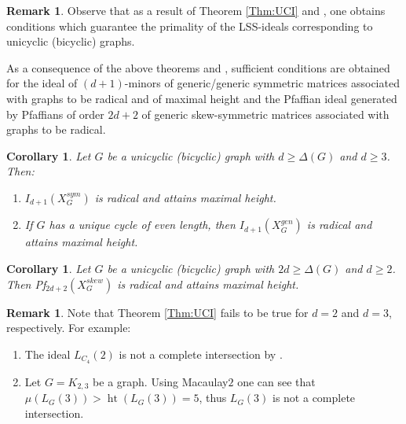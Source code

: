 \documentclass[11pt,a4paper,reqno]{amsart}
\newtheorem{cor}[thm]{Corollary}
\theoremstyle{definition}
\newtheorem{remark}[thm]{Remark}
\numberwithin{equation}{section}
\DeclareMathOperator{\het}{ht}
\begin{document}
\begin{remark}
    Observe that as a result of Theorem \ref{Thm:UCI} and \cite[Theorem $1.1$]{CW2019}, one obtains conditions which guarantee the primality of the LSS-ideals corresponding to unicyclic (bicyclic) graphs.   
\end{remark}


As a consequence of the above theorems and \cite[Proposition 7.4, 7.5, 7.7]{CW2019}, sufficient conditions are obtained for the ideal of $(d+1)$-minors of generic/generic symmetric matrices associated with 
graphs to be radical and of maximal height and the Pfaffian ideal generated by Pfaffians of order $2d+2$ of generic skew-symmetric matrices associated with graphs to be radical. 



\begin{cor}
    Let $G$ be a unicyclic (bicyclic) graph with $d \geq \Delta(G)$ and $d \geq 3$. Then: 
    \begin{enumerate}
        \item 
        $I_{d+1}(X_G^{sym})$ is radical and attains maximal height.
        \item If $G$ has a unique cycle of even length, then $I_{d+1}(X_G^{gen})$ is radical and attains maximal height. 
    \end{enumerate}
\end{cor}




\begin{cor}
Let $G$ be a unicyclic (bicyclic) graph with $2d\geq \Delta(G)$ and $d \geq 2$. Then Pf$_{2d+2}(X_G^{skew})$ is radical and attains maximal height.    
\end{cor}


\begin{remark}
    Note that Theorem \ref{Thm:UCI} fails to be true for $d=2$ and $d=3$, respectively. For example:  
    \begin{enumerate}
        \item  The ideal $L_{C_4}(2)$ is not a complete intersection by \cite[Theorem 3.5]{AK2021}. 
        \item  Let $G=K_{2,3}$ be a graph. Using Macaulay$2$ one can see that $\mu(L_G(3)) > \het(L_G(3))=5$, thus $L_G(3)$ is not a complete intersection.
    \end{enumerate}
\end{remark}
\end{document}
